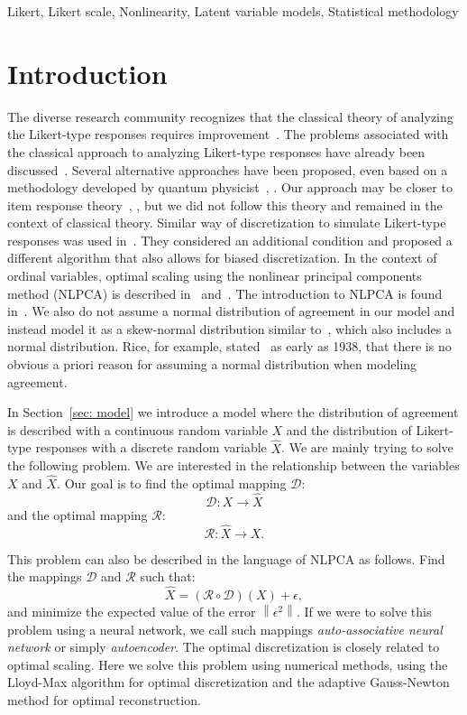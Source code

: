 \documentclass[10pt]{article}
\newcommand{\norm}[1]{\left\lVert#1\right\rVert}
\providecommand{\keywords}[1]{\textbf{\text{Keywords:}} #1}
\begin{document}
\keywords{Likert, Likert scale, Nonlinearity, Latent variable models, Statistical methodology}

\tableofcontents


\section{Introduction}
The diverse research community recognizes that the classical theory of analyzing the Likert-type responses requires improvement~\cite{Alphen}. The problems associated with the classical approach to analyzing Likert-type responses have already been discussed~\cite{Harwell}. Several alternative approaches have been proposed, even based on a methodology developed by quantum physicist~\cite{Camparo1}, \cite{Camparo2}. Our approach may be closer to item response theory~\cite{Jabrayilov}, \cite{Magno}, but we did not follow this theory and remained in the context of classical theory. Similar way of discretization to simulate Likert-type responses was used in~\cite{Boari}. They considered an additional condition and proposed a different algorithm that also allows for biased discretization. In the context of ordinal variables, optimal scaling using the nonlinear principal components method (NLPCA) is described in~\cite{Young} and~\cite{Gifi}. The introduction to NLPCA is found in~\cite{DeLeeuw}. We also do not assume a normal distribution of agreement in our model and instead model it as a skew-normal distribution similar to~\cite{Eijk}, which also includes a normal distribution. Rice, for example, stated~\cite{Rice} as early as 1938, that there is no obvious a priori reason for assuming a normal distribution when modeling agreement.

In Section~\ref{sec: model} we introduce a model where the distribution of agreement is described with a continuous random variable $X$ and the distribution of Likert-type responses with a discrete random variable $\hat{X}$. We are mainly trying to solve the following problem. We are interested in the relationship between the variables $X$ and $\hat{X}$. Our goal is to find the optimal mapping $\mathcal{D}$:
\begin{equation}
\mathcal{D}: X \rightarrow \hat{X}
\end{equation}
and the optimal mapping $\mathcal{R}$:
\begin{equation}
\mathcal{R}: \hat{X} \rightarrow X.
\end{equation}

This problem can also be described in the language of NLPCA as follows. Find the mappings $\mathcal{D}$ and $\mathcal{R}$ such that:
\begin{equation}
\hat{X} = \left( \mathcal{R} \circ \mathcal{D} \right) (X) + \epsilon,
\end{equation}
and minimize the expected value of the error $\norm{\epsilon^{2}}$. If we were to solve this problem using a neural network, we call such mappings {\it auto-associative neural network} or simply {\it autoencoder}. The optimal discretization is closely related to optimal scaling. Here we solve this problem using numerical methods, using the Lloyd-Max algorithm for optimal discretization and the adaptive Gauss-Newton method for optimal reconstruction. 
\end{document}
